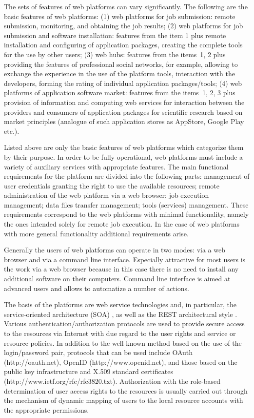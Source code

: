 \documentclass[procedia]{easychair}
\begin{document}
The sets of features of web platforms can vary significantly. The following are the basic features of web platforms: (1) web platforms for job submission: remote submission, monitoring, and obtaining the job results; (2) web platforms for job submission and software installation: features from the item 1 plus remote installation and configuring of application packages, creating the complete tools for the use by other users; (3) web hubs: features from the items 1, 2 plus providing the features of professional social networks, for example, allowing to exchange the experience in the use of the platform tools, interaction with the developers, forming the rating of individual application packages/tools; (4) web platforms of application software market: features from the items 1, 2, 3 plus provision of information and computing web services for interaction between the providers and consumers of application packages for scientific research based on market principles (analogue of such application stores as AppStore, Google Play etc.).

Listed above are only the basic features of web platforms which categorize them by their purpose. In order to be fully operational, web platforms must include a variety of auxiliary services with appropriate features. The main functional requirements for the platform are divided into the following parts: management of user credentials granting the right to use the available resources; remote administration of the web platform via a web browser; job execution management; data files transfer management; tools (services) management. These requirements correspond to the web platforms with minimal functionality, namely the ones intended solely for remote job execution. In the case of web platforms with more general functionality  additional requirements arise. 

Generally the users of web platforms can operate in two modes: via a web browser and via a command line interface. Especially attractive for most users is the work via a web browser because in this case there is no need to install any additional software on their computers. Command line interface is aimed at advanced users and allows to automatize a number of actions.

The basis of the platforms are web service technologies and, in particular, the service-oriented architecture (SOA) \cite{6}, as well as the REST architectural style \cite{7}. Various authentication/authorization protocols are used to provide secure access to the resources via Internet with due regard to the user rights and service or resource policies. In addition to the well-known method based on the use of the login/password pair, protocols that can be used include OAuth (http://oauth.net), OpenID (http://www.openid.net), and those based on the public key infrastructure and X.509 standard certificates (http://www.ietf.org/rfc/rfc3820.txt). Authorization with the role-based determination of user access rights to the resources is usually carried out through the mechanism of dynamic mapping of users to the local resource accounts with the appropriate permissions.
\end{document}

